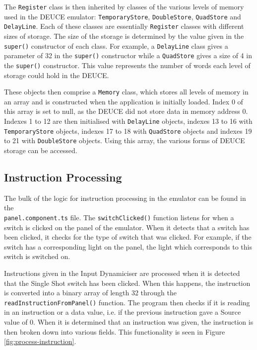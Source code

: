 \documentclass{l4proj}
\begin{document}
The \texttt{Register} class is then inherited by classes of the various levels of memory used in the DEUCE emulator: \texttt{TemporaryStore}, \texttt{DoubleStore}, \texttt{QuadStore} and \texttt{DelayLine}. Each of these classes are essentially \texttt{Register} classes with different sizes of storage. The size of the storage is determined by the value given in the \texttt{super()} constructor of each class. For example, a \texttt{DelayLine} class gives a parameter of 32 in the \texttt{super()} constructor while a \texttt{QuadStore} gives a size of 4 in the \texttt{super()} constructor. This value represents the number of words each level of storage could hold in the DEUCE.

These objects then comprise a \texttt{Memory} class, which stores all levels of memory in an array and is constructed when the application is initially loaded. Index 0 of this array is set to null, as the DEUCE did not store data in memory address 0. Indexes 1 to 12 are then initialised with \texttt{DelayLine} objects, indexes 13 to 16 with \texttt{TemporaryStore} objects, indexes 17 to 18 with \texttt{QuadStore} objects and indexes 19 to 21 with \texttt{DoubleStore} objects. Using this array, the various forms of DEUCE storage can be accessed.

\subsection{Instruction Processing}
The bulk of the logic for instruction processing in the emulator can be found in the\\ \texttt{panel.component.ts} file. The \texttt{switchClicked()} function listens for when a switch is clicked on the panel of the emulator. When it detects that a switch has been clicked, it checks for the type of switch that was clicked. For example, if the switch has a corresponding light on the panel, the light which corresponds to this switch is switched on. 

Instructions given in the Input Dynamiciser are processed when it is detected that the Single Shot switch has been clicked. When this happens, the instruction is converted into a binary array of length 32 through the \texttt{readInstructionFromPanel()} function. The program then checks if it is reading in an instruction or a data value, i.e. if the previous instruction gave a Source value of 0. When it is determined that an instruction was given, the instruction is then broken down into various fields. This functionality is seen in Figure \ref{fig:process-instruction}.
\end{document}
